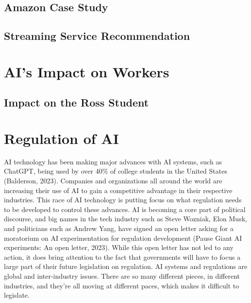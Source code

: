 \documentclass[
]{book}
\begin{document}
\hypertarget{amazon-case-study}{%
\section{Amazon Case Study}\label{amazon-case-study}}

\hypertarget{streaming-service-recommendation}{%
\section{Streaming Service Recommendation}\label{streaming-service-recommendation}}

\hypertarget{ais-impact-on-workers}{%
\chapter{AI's Impact on Workers}\label{ais-impact-on-workers}}

\hypertarget{impact-on-the-ross-student}{%
\section{Impact on the Ross Student}\label{impact-on-the-ross-student}}

\hypertarget{regulation-of-ai}{%
\chapter{Regulation of AI}\label{regulation-of-ai}}

AI technology has been making major advances with AI systems, such as ChatGPT, being used by over 40\% of college students in the United States (Balderson, 2023). Companies and organizations all around the world are increasing their use of AI to gain a competitive advantage in their respective industries. This race of AI technology is putting focus on what regulation needs to be developed to control these advances. AI is becoming a core part of political discourse, and big names in the tech industry such as Steve Wozniak, Elon Musk, and politicians such as Andrew Yang, have signed an open letter asking for a moratorium on AI experimentation for regulation development (Pause Giant AI experiments: An open letter, 2023). While this open letter has not led to any action, it does bring attention to the fact that governments will have to focus a large part of their future legislation on regulation. AI systems and regulations are global and inter-industry issues. There are so many different pieces, in different industries, and they're all moving at different paces, which makes it difficult to legislate.
\end{document}
